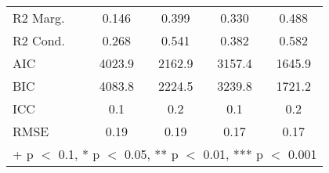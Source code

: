 \begin{table}
\begin{tabular}[t]{lcccc}
R2 Marg. & \num{0.146} & \num{0.399} & \num{0.330} & \num{0.488}\\
R2 Cond. & \num{0.268} & \num{0.541} & \num{0.382} & \num{0.582}\\
AIC & \num{4023.9} & \num{2162.9} & \num{3157.4} & \num{1645.9}\\
BIC & \num{4083.8} & \num{2224.5} & \num{3239.8} & \num{1721.2}\\
ICC & \num{0.1} & \num{0.2} & \num{0.1} & \num{0.2}\\
RMSE & \num{0.19} & \num{0.19} & \num{0.17} & \num{0.17}\\
\bottomrule
\multicolumn{5}{l}{\rule{0pt}{1em}+ p $<$ 0.1, * p $<$ 0.05, ** p $<$ 0.01, *** p $<$ 0.001}\\
\end{tabular}
\end{table}
